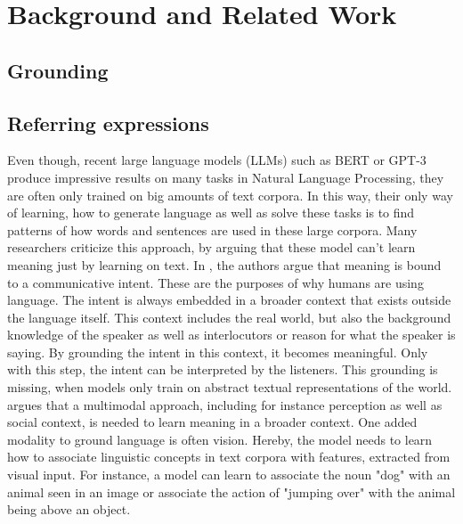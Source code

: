 \section{Background and Related Work}
\label{sec:background}

\subsection{Grounding}

\subsection{Referring expressions}
Even though, recent large language models (LLMs) such as BERT \citep{Devlin2019} or GPT-3 \citep{Brown2020} produce impressive results on many tasks in Natural Language Processing, they are often only trained on big amounts of text corpora.
In this way, their only way of learning, how to generate language as well as solve these tasks is to find patterns of how words and sentences are used in these large corpora.
Many researchers criticize this approach, by arguing that these model can't learn meaning just by learning on text.
In \citep{Bender2020}, the authors argue that meaning is bound to a communicative intent.
These are the purposes of why humans are using language.
The intent is always embedded in a broader context that exists outside the language itself.
This context includes the real world, but also the background knowledge of the speaker as well as interlocutors or reason for what the speaker is saying.
By grounding the intent in this context, it becomes meaningful.
Only with this step, the intent can be interpreted by the listeners.
This grounding is missing, when models only train on abstract textual representations of the world.
\citet{Bisk2020} argues that a multimodal approach, including for instance perception as well as social context, is needed to learn meaning in a broader context.
One added modality to ground language is often vision.
Hereby, the model needs to learn how to associate linguistic concepts in text corpora with features, extracted from visual input.
For instance, a model can learn to associate the noun "dog" with an animal seen in an image or associate the action of "jumping over" with the animal being above an object.

